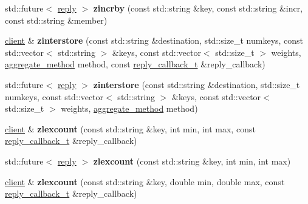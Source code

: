 \begin{DoxyCompactItemize}
std\+::future$<$ \hyperlink{classcpp__redis_1_1reply}{reply} $>$ {\bfseries zincrby} (const std\+::string \&key, const std\+::string \&incr, const std\+::string \&member)
\item 
\mbox{\label{classcpp__redis_1_1client_a9cbe706bc10de8dca177232090bbe12b}} 
\hyperlink{classcpp__redis_1_1client}{client} \& {\bfseries zinterstore} (const std\+::string \&destination, std\+::size\+\_\+t numkeys, const std\+::vector$<$ std\+::string $>$ \&keys, const std\+::vector$<$ std\+::size\+\_\+t $>$ weights, \hyperlink{classcpp__redis_1_1client_aa197ca5b36da793c701d3ba388ec4946}{aggregate\+\_\+method} method, const \hyperlink{classcpp__redis_1_1client_a061a1140d36d2eaeda82b09a0bb3f9f2}{reply\+\_\+callback\+\_\+t} \&reply\+\_\+callback)
\item 
\mbox{\label{classcpp__redis_1_1client_a8256ce5c6eea36a68f7ba2ac0912da72}} 
std\+::future$<$ \hyperlink{classcpp__redis_1_1reply}{reply} $>$ {\bfseries zinterstore} (const std\+::string \&destination, std\+::size\+\_\+t numkeys, const std\+::vector$<$ std\+::string $>$ \&keys, const std\+::vector$<$ std\+::size\+\_\+t $>$ weights, \hyperlink{classcpp__redis_1_1client_aa197ca5b36da793c701d3ba388ec4946}{aggregate\+\_\+method} method)
\item 
\mbox{\label{classcpp__redis_1_1client_ad4a8fef29a047724ad4e97eedfb53c62}} 
\hyperlink{classcpp__redis_1_1client}{client} \& {\bfseries zlexcount} (const std\+::string \&key, int min, int max, const \hyperlink{classcpp__redis_1_1client_a061a1140d36d2eaeda82b09a0bb3f9f2}{reply\+\_\+callback\+\_\+t} \&reply\+\_\+callback)
\item 
\mbox{\label{classcpp__redis_1_1client_aff60a1181d93d961f6ca1903522ce899}} 
std\+::future$<$ \hyperlink{classcpp__redis_1_1reply}{reply} $>$ {\bfseries zlexcount} (const std\+::string \&key, int min, int max)
\item 
\mbox{\label{classcpp__redis_1_1client_aba1b2a6c750b13b1a632ebc8ca90cf60}} 
\hyperlink{classcpp__redis_1_1client}{client} \& {\bfseries zlexcount} (const std\+::string \&key, double min, double max, const \hyperlink{classcpp__redis_1_1client_a061a1140d36d2eaeda82b09a0bb3f9f2}{reply\+\_\+callback\+\_\+t} \&reply\+\_\+callback)

\end{DoxyCompactItemize}

